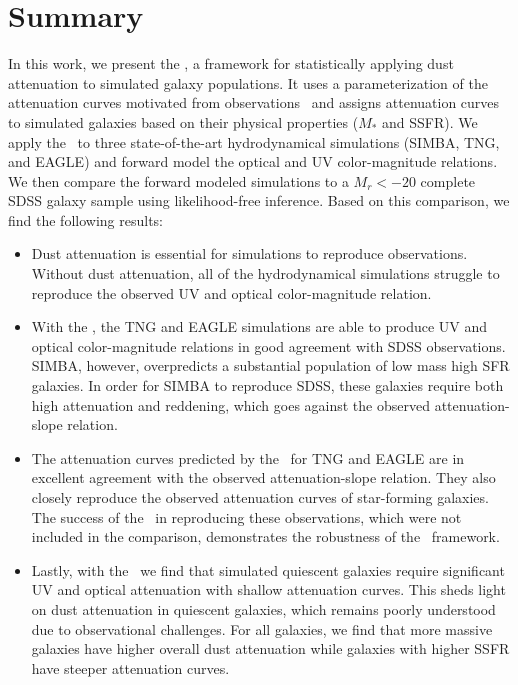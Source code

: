 \section{Summary}
In this work, we present the \eda, a framework for statistically applying dust
attenuation to simulated galaxy populations. It uses a parameterization of 
the attenuation curves motivated from observations~\citep{noll2009} and
assigns attenuation curves to simulated galaxies based on their physical properties ($M_*$ and SSFR).
We apply the \eda~to 
three state-of-the-art hydrodynamical simulations (SIMBA, TNG, and EAGLE) and
forward model the optical and UV color-magnitude relations. We then compare
the forward modeled simulations to a $M_r < -20$ complete SDSS galaxy sample  
using likelihood-free inference. Based on this comparison, we find the
following results: 

\begin{itemize}
    \item Dust attenuation is essential for simulations to reproduce observations.
        Without dust attenuation, all of the hydrodynamical simulations struggle
        to reproduce the observed UV and optical color-magnitude relation. 
    \item With the \eda, the TNG and EAGLE simulations are able to produce UV and
        optical color-magnitude relations in good agreement with SDSS observations. 
        SIMBA, however, overpredicts a substantial population of low mass high
        SFR galaxies. In order for SIMBA to reproduce SDSS, these galaxies require
        both high attenuation and reddening, which goes against the observed 
        attenuation-slope relation. 
    \item The attenuation curves predicted by the \eda~for TNG and EAGLE are in
        excellent agreement with the observed attenuation-slope
        relation. They also closely reproduce the observed attenuation curves
        of star-forming galaxies. The success of the \eda~in reproducing these
        observations, which were not included in the comparison, demonstrates
        the robustness of the \eda~framework. 
    \item Lastly, with the \eda~we find that simulated quiescent galaxies
        require significant UV and optical attenuation with shallow attenuation
        curves. This sheds light on dust attenuation in quiescent galaxies,
        which remains poorly understood due to observational challenges. 
        For all galaxies, we find that more massive galaxies have higher overall dust
        attenuation while galaxies with higher SSFR have steeper attenuation
        curves. 
\end{itemize}

